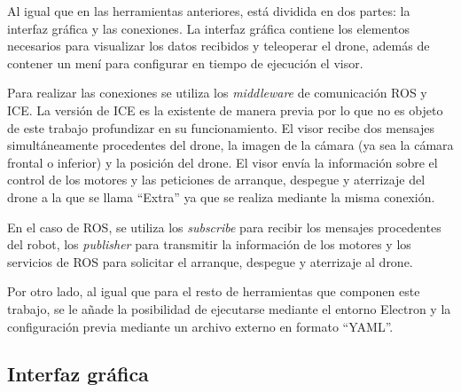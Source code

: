 Al igual que en las herramientas anteriores, está dividida en dos partes: la interfaz gráfica y las conexiones. La interfaz gráfica contiene los elementos necesarios para visualizar los datos recibidos y teleoperar el drone, además de contener un mení para configurar en tiempo de ejecución el visor.

Para realizar las conexiones se utiliza los \textit{middleware} de comunicación ROS y ICE. La versión de ICE es la existente de manera previa por lo que no es objeto de este trabajo profundizar en su funcionamiento. El visor recibe dos mensajes simultáneamente procedentes del drone, la imagen de la cámara (ya sea la cámara frontal o inferior) y la posición del drone. El visor envía la información sobre el control de los motores y las peticiones de arranque, despegue y aterrizaje del drone a la que se llama ``Extra'' ya que se realiza mediante la misma conexión.

En el caso de ROS, se utiliza los \textit{subscribe} para recibir los mensajes procedentes del robot, los \textit{publisher} para transmitir la información de los motores y los servicios de ROS para solicitar el arranque, despegue y aterrizaje al drone.

Por otro lado, al igual que para el resto de herramientas que componen este trabajo, se le añade la posibilidad de ejecutarse mediante el entorno Electron y la configuración previa mediante un archivo externo en formato ``YAML''.

\subsection{Interfaz gráfica}

